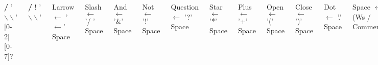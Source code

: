 \begin{frame}
\begin{minipage}{\textwidth}
\begin{columns}
		\textbf{/}  '$\backslash\backslash$' [0-2][0-7]?
		
		\textbf{/}	!  '$\backslash\backslash$'

		\tiny
		Larrow $\leftarrow$ '$\leftarrow$' Space
		
		Slash $\leftarrow$ '/ ' Space
		
		And $\leftarrow$ '\&' Space
		
		Not $\leftarrow$ '!' Space
		
		Question $\leftarrow$ '?' Space
		
		Star $\leftarrow$ '*' Space
		
		Plus $\leftarrow$ '+' Space
		
		Open $\leftarrow$ '(' Space
		
		Close $\leftarrow$ ')' Space
		
		Dot $\leftarrow$ '.' Space
		
		Space $\leftarrow$ (Ws /  Comment)*
		
		Comment $\leftarrow$ '\#' (!EOL .)* EOL
		
		Space $\leftarrow$ '  ' \textbf{/}	'$\backslash$t' \textbf{/}
		
		EOL $\leftarrow$ '$\backslash$r$\backslash$n' \textbf{/} '$\backslash$n' \textbf{/} '$\backslash$r'
		
		EOF $\leftarrow$ ! .
		
		
			
\end{columns}
\end{minipage}
\end{frame}

